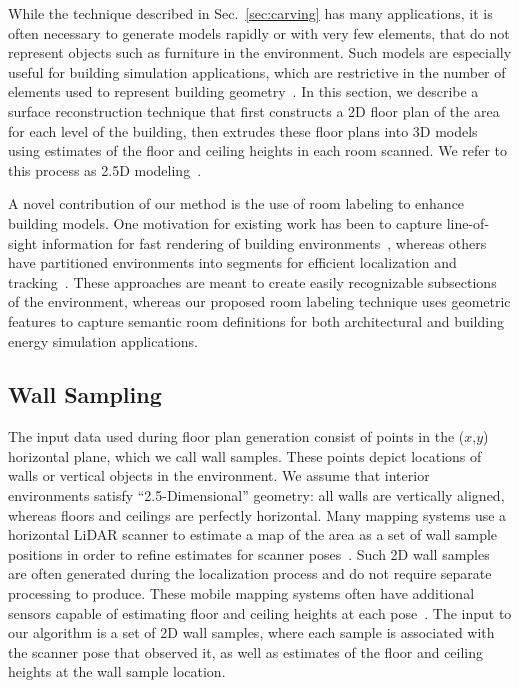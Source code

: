 \documentclass[10pt,twocolumn,twoside]{IEEEtran}
\begin{document}
While the technique described in Sec.~\ref{sec:carving} has many applications, it is often necessary to generate models rapidly or with very few elements, that do not represent objects such as furniture in the environment.  Such models are especially useful for building simulation applications, which are restrictive in the number of elements used to represent building geometry~\cite{EnergyPlus}.  In this section, we describe a surface reconstruction technique that first constructs a 2D floor plan of the area for each level of the building, then extrudes these floor plans into 3D models using estimates of the floor and ceiling heights in each room scanned.  We refer to this process as 2.5D modeling~\cite{Turner14}.

A novel contribution of our method is the use of room labeling to enhance building models.  One motivation for existing work has been to capture line-of-sight information for fast rendering of building environments~\cite{WalkthroughRendering}, whereas others have partitioned environments into segments for efficient localization and tracking~\cite{SpectralClustering}.  These approaches are meant to create easily recognizable subsections of the environment, whereas our proposed room labeling technique uses geometric features to capture semantic room definitions for both architectural and building energy simulation applications.

\subsection{Wall Sampling}
\label{ssec:wall_sampling}
The input data used during floor plan generation consist of points in the ($x$,$y$) horizontal plane, which we call wall samples.  These points depict locations of walls or vertical objects in the environment.  We assume that interior environments satisfy ``2.5-Dimensional'' geometry:  all walls are vertically aligned, whereas floors and ceilings are perfectly horizontal.  Many mapping systems use a horizontal LiDAR scanner to estimate a map of the area as a set of wall sample positions in order to refine estimates for scanner poses~\cite{MITBackpack,NickJournal}.  Such 2D wall samples are often generated during the localization process and do not require separate processing to produce.  These mobile mapping systems often have additional sensors capable of estimating floor and ceiling heights at each pose~\cite{Backpack,Quadrotor}.  The input to our algorithm is a set of 2D wall samples, where each sample is associated with the scanner pose that observed it, as well as estimates of the floor and ceiling heights at the wall sample location.
\end{document}
